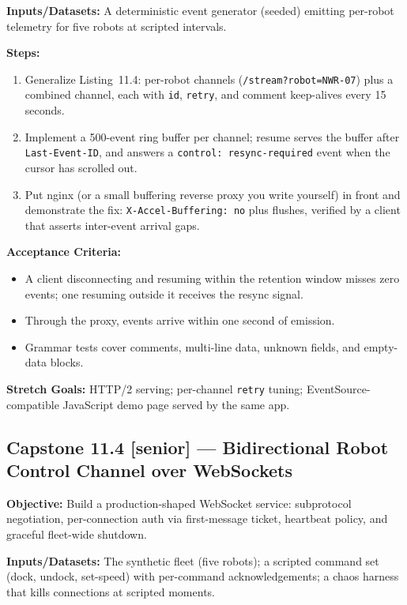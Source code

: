 \textbf{Inputs/Datasets:} A deterministic event generator (seeded) emitting
per-robot telemetry for five robots at scripted intervals.

\textbf{Steps:}
\begin{enumerate}
  \item Generalize Listing~11.4: per-robot channels
        (\texttt{/stream?robot=NWR-07}) plus a combined channel, each with
        \texttt{id}, \texttt{retry}, and comment keep-alives every 15
        seconds.
  \item Implement a 500-event ring buffer per channel; resume serves the
        buffer after \texttt{Last-Event-ID}, and answers a
        \texttt{control: resync-required} event when the cursor has scrolled
        out.
  \item Put nginx (or a small buffering reverse proxy you write yourself) in
        front and demonstrate the fix: \texttt{X-Accel-Buffering: no} plus
        flushes, verified by a client that asserts inter-event arrival gaps.
\end{enumerate}

\textbf{Acceptance Criteria:}
\begin{itemize}[label=$\square$]
  \item A client disconnecting and resuming within the retention window
        misses zero events; one resuming outside it receives the resync
        signal.
  \item Through the proxy, events arrive within one second of emission.
  \item Grammar tests cover comments, multi-line data, unknown fields, and
        empty-data blocks.
\end{itemize}

\textbf{Stretch Goals:} HTTP/2 serving; per-channel \texttt{retry} tuning;
EventSource-compatible JavaScript demo page served by the same app.

\subsection{Capstone 11.4 [senior] --- Bidirectional Robot Control Channel over WebSockets}

\textbf{Objective:} Build a production-shaped WebSocket service: subprotocol
negotiation, per-connection auth via first-message ticket, heartbeat policy,
and graceful fleet-wide shutdown.

\textbf{Inputs/Datasets:} The synthetic fleet (five robots); a scripted
command set (dock, undock, set-speed) with per-command acknowledgements;
a chaos harness that kills connections at scripted moments.

